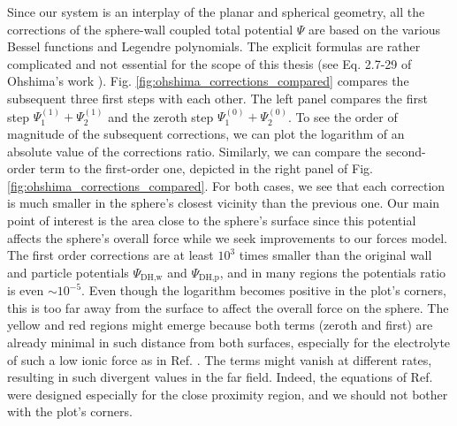 \documentclass{master_thesis}
\begin{document}
Since our system is an interplay of the planar and spherical geometry, all the corrections of the sphere-wall coupled total potential $\Psi$ are based on the various Bessel functions and Legendre polynomials. The explicit formulas are rather complicated and not essential for the scope of this thesis (see Eq. 2.7-29 of Ohshima's work \cite{ohshima1998}). Fig. \ref{fig:ohshima_corrections_compared} compares the subsequent three first steps with each other. The left panel compares the first step $\Psi_{1}^{(1)}+\Psi_{2}^{(1)}$ and the zeroth step $\Psi_{1}^{(0)}+\Psi_{2}^{(0)}$. To see the order of magnitude of the subsequent corrections, we can plot the logarithm of an absolute value of the corrections ratio. Similarly, we can compare the second-order term to the first-order one, depicted in the right panel of Fig. \ref{fig:ohshima_corrections_compared}. For both cases, we see that each correction is much smaller in the sphere's closest vicinity than the previous one. Our main point of interest is the area close to the sphere's surface since this potential affects the sphere's overall force while we seek improvements to our forces model. The first order corrections are at least $10^{3}$ times smaller than the original wall and particle potentials $\Psi_{\textrm{DH,w}}$ and $\Psi_{\textrm{DH,p}}$, and in many regions the potentials ratio is even $\sim10^{-5}$. Even though the logarithm becomes positive in the plot's corners, this is too far away from the surface to affect the overall force on the sphere. The yellow and red regions might emerge because both terms (zeroth and first) are already minimal in such distance from both surfaces, especially for the electrolyte of such a low ionic force as in Ref. \cite{verweij2021}. The terms might vanish at different rates, resulting in such divergent values in the far field. Indeed, the equations of Ref. \cite{ohshima1998} were designed especially for the close proximity region, and we should not bother with the plot's corners.
\end{document}
